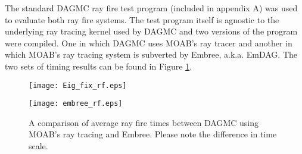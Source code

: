 The standard DAGMC ray fire test program (included in appendix A) was used to
evaluate both ray fire systems. The test program itself is agnostic to the
underlying ray tracing kernel used by DAGMC and two versions of the program were
compiled. One in which DAGMC uses MOAB's ray tracer and another in which MOAB's
ray tracing system is subverted by Embree, a.k.a. EmDAG. The two sets of timing
results can be found in Figure \ref{emdag_timing_compare}.

\begin{figure}[H]
  \vspace{-3cm}
  \centering

  \begin{minipage}{.5\textwidth}
    \centering
    \texttt{[image: Eig\_fix\_rf.eps]}
  \end{minipage}%
  \begin{minipage}{.5\textwidth}
    \centering
    \texttt{[image: embree\_rf.eps]}
  \end{minipage}
  \caption{A comparison of average ray fire times between DAGMC using MOAB's ray
    tracing and Embree. Please note the difference in time scale.}
  \label{emdag_timing_compare}
\end{figure}

